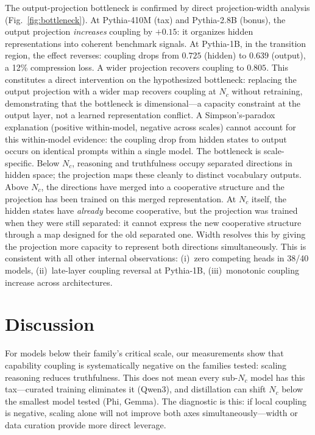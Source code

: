 \documentclass{article}
\begin{document}
The output-projection bottleneck is confirmed by direct projection-width analysis
(Fig.~\ref{fig:bottleneck}).
At Pythia-410M (tax) and Pythia-2.8B (bonus),
the output projection \emph{increases} coupling by $+0.15$:
it organizes hidden representations into coherent benchmark signals.
At Pythia-1B, in the transition region, the effect reverses:
coupling drops from $0.725$ (hidden) to $0.639$ (output),
a 12\% compression loss.
A wider projection recovers coupling to $0.805$.
This constitutes a direct intervention on the hypothesized bottleneck:
replacing the output projection with a wider map recovers coupling
at $N_c$ without retraining, demonstrating that the bottleneck is dimensional---a
capacity constraint at the output layer, not a learned representation conflict.
A Simpson's-paradox explanation (positive within-model, negative across scales)
cannot account for this within-model evidence: the coupling drop from hidden
states to output occurs on identical prompts within a single model.
The bottleneck is scale-specific.
Below $N_c$, reasoning and truthfulness occupy separated directions in hidden space;
the projection maps these cleanly to distinct vocabulary outputs.
Above $N_c$, the directions have merged into a cooperative structure and
the projection has been trained on this merged representation.
At $N_c$ itself, the hidden states have \emph{already} become cooperative,
but the projection was trained when they were still separated:
it cannot express the new cooperative structure through a map
designed for the old separated one.
Width resolves this by giving the projection more capacity
to represent both directions simultaneously.
This is consistent with all other internal observations:
(i)~zero competing heads in 38/40 models,
(ii)~late-layer coupling reversal at Pythia-1B,
(iii)~monotonic coupling increase across architectures.

\section{Discussion}
\label{sec:discussion}

For models below their family's critical scale, our measurements show
that capability coupling is systematically negative on the families tested:
scaling reasoning reduces truthfulness.
This does not mean every sub-$N_c$ model has this tax---curated training eliminates it
(Qwen3), and distillation can shift $N_c$ below the smallest model tested (Phi, Gemma).
The diagnostic is this: if local coupling is negative, scaling alone will not improve
both axes simultaneously---width or data curation provide more direct leverage.
\end{document}
